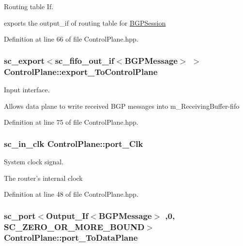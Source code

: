 Routing table If. 

exports the output\-\_\-if of routing table for \hyperlink{classBGPSession}{B\-G\-P\-Session} 

Definition at line 66 of file Control\-Plane.\-hpp.

\hypertarget{classControlPlane_a8eeed022eec78d21f65728c01490684e}{
\subsubsection[{export\-\_\-\-To\-Control\-Plane}]{\setlength{\rightskip}{0pt plus 5cm}sc\-\_\-export$<$sc\-\_\-fifo\-\_\-out\-\_\-if$<${\bf B\-G\-P\-Message}$>$ $>$ Control\-Plane\-::export\-\_\-\-To\-Control\-Plane}}\label{classControlPlane_a8eeed022eec78d21f65728c01490684e}


Input interface. 

Allows data plane to write received B\-G\-P messages into m\-\_\-\-Receiving\-Buffer-\/fifo 

Definition at line 75 of file Control\-Plane.\-hpp.

\hypertarget{classControlPlane_ab0c4f01f5a65a86750cc4011bc531b70}{
\subsubsection[{port\-\_\-\-Clk}]{\setlength{\rightskip}{0pt plus 5cm}sc\-\_\-in\-\_\-clk Control\-Plane\-::port\-\_\-\-Clk}}\label{classControlPlane_ab0c4f01f5a65a86750cc4011bc531b70}


System clock signal. 

The router's internal clock 

Definition at line 48 of file Control\-Plane.\-hpp.

\hypertarget{classControlPlane_adff1abdc123100e569d92ce1485a378e}{
\subsubsection[{port\-\_\-\-To\-Data\-Plane}]{\setlength{\rightskip}{0pt plus 5cm}sc\-\_\-port$<${\bf Output\-\_\-\-If}$<${\bf B\-G\-P\-Message}$>$ ,0, S\-C\-\_\-\-Z\-E\-R\-O\-\_\-\-O\-R\-\_\-\-M\-O\-R\-E\-\_\-\-B\-O\-U\-N\-D$>$ Control\-Plane\-::port\-\_\-\-To\-Data\-Plane}}\label{classControlPlane_adff1abdc123100e569d92ce1485a378e}


